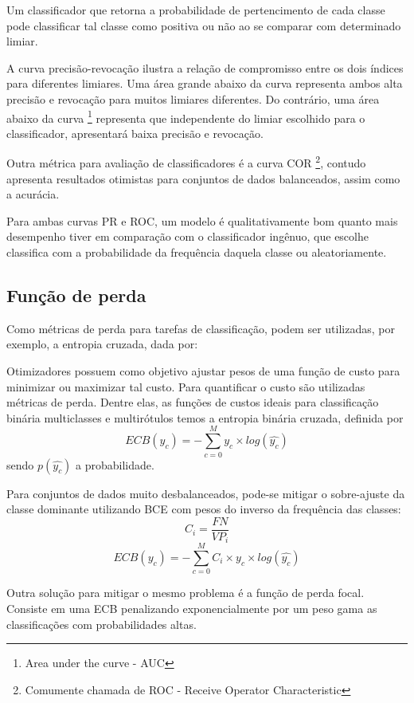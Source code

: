 Um classificador que retorna a probabilidade de pertencimento de cada classe pode classificar tal classe como positiva ou não ao se comparar com determinado limiar.

A curva precisão-revocação ilustra a relação de compromisso entre os dois índices para diferentes limiares. Uma área grande abaixo da curva representa ambos alta precisão e revocação para muitos limiares diferentes. Do contrário, uma área abaixo da curva \footnote[1]{Area under the curve - AUC} representa que independente do limiar escolhido para o classificador, apresentará baixa precisão e revocação.

Outra métrica para avaliação de classificadores é a curva COR \footnote[2]{Comumente chamada de ROC - Receive Operator Characteristic}, contudo apresenta resultados otimistas para conjuntos de dados balanceados, assim como a acurácia.

Para ambas curvas PR e ROC, um modelo é qualitativamente bom quanto mais desempenho tiver em comparação com o classificador ingênuo, que escolhe classifica com a probabilidade da frequência daquela classe ou aleatoriamente.

\subsection{Função de perda}\label{sec:cap2_fucao_de_perda}

Como métricas de perda para tarefas de classificação, podem ser utilizadas, por exemplo, a entropia cruzada, dada por:

Otimizadores possuem como objetivo ajustar pesos de uma função de custo para minimizar ou maximizar tal custo. Para quantificar o custo são utilizadas métricas de perda. Dentre elas, as funções de custos ideais para classificação binária multiclasses e multirótulos temos a entropia binária cruzada, definida por 
$$ECB(y_c) = -\sum_{c=0}^{M} y_c \times log(\hat{y_c})$$
sendo $p(\hat{y_c})$ a probabilidade. 

Para conjuntos de dados muito desbalanceados, pode-se mitigar o sobre-ajuste da classe dominante utilizando BCE com pesos do inverso da frequência das classes:
$$ C_i = \frac{FN}{VP_i} $$
$$ECB(y_c) = -\sum_{c=0}^{M} C_i \times y_c \times log(\hat{y_c})$$


Outra solução para mitigar o mesmo problema é a função de perda focal. Consiste em uma ECB penalizando exponencialmente por um peso gama as classificações com probabilidades altas.\cite{https://doi.org/10.48550/arxiv.2106.10270}

